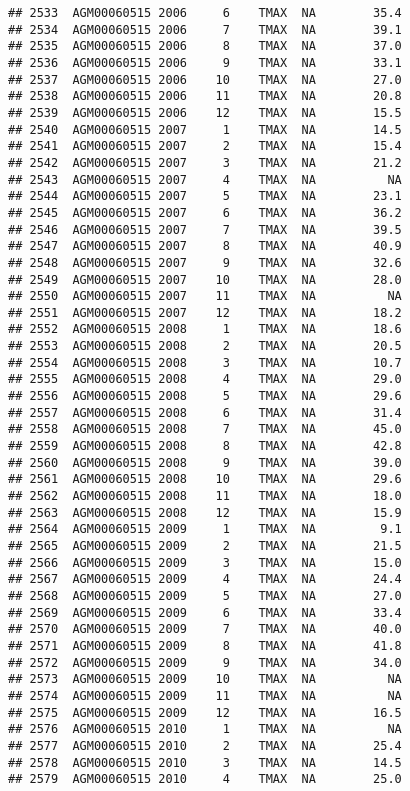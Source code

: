 \documentclass{article}\usepackage[]{graphicx}\usepackage[]{color}
\makeatletter
\newenvironment{kframe}{%
 \def\at@end@of@kframe{}%
 \ifinner\ifhmode%
  \def\at@end@of@kframe{\end{minipage}}%
  \begin{minipage}{\columnwidth}%
 \fi\fi%
 \def\FrameCommand##1{\hskip\@totalleftmargin \hskip-\fboxsep
 \colorbox{shadecolor}{##1}\hskip-\fboxsep
     \hskip-\linewidth \hskip-\@totalleftmargin \hskip\columnwidth}%
 \MakeFramed {\advance\hsize-\width
   \@totalleftmargin\z@ \linewidth\hsize
   \@setminipage}}%
 {\par\unskip\endMakeFramed%
 \at@end@of@kframe}
\newenvironment{knitrout}{}{} %
\makeatother
\begin{document}
\begin{knitrout}
\begin{kframe}
\begin{verbatim}
## 2533  AGM00060515 2006     6    TMAX  NA        35.4
## 2534  AGM00060515 2006     7    TMAX  NA        39.1
## 2535  AGM00060515 2006     8    TMAX  NA        37.0
## 2536  AGM00060515 2006     9    TMAX  NA        33.1
## 2537  AGM00060515 2006    10    TMAX  NA        27.0
## 2538  AGM00060515 2006    11    TMAX  NA        20.8
## 2539  AGM00060515 2006    12    TMAX  NA        15.5
## 2540  AGM00060515 2007     1    TMAX  NA        14.5
## 2541  AGM00060515 2007     2    TMAX  NA        15.4
## 2542  AGM00060515 2007     3    TMAX  NA        21.2
## 2543  AGM00060515 2007     4    TMAX  NA          NA
## 2544  AGM00060515 2007     5    TMAX  NA        23.1
## 2545  AGM00060515 2007     6    TMAX  NA        36.2
## 2546  AGM00060515 2007     7    TMAX  NA        39.5
## 2547  AGM00060515 2007     8    TMAX  NA        40.9
## 2548  AGM00060515 2007     9    TMAX  NA        32.6
## 2549  AGM00060515 2007    10    TMAX  NA        28.0
## 2550  AGM00060515 2007    11    TMAX  NA          NA
## 2551  AGM00060515 2007    12    TMAX  NA        18.2
## 2552  AGM00060515 2008     1    TMAX  NA        18.6
## 2553  AGM00060515 2008     2    TMAX  NA        20.5
## 2554  AGM00060515 2008     3    TMAX  NA        10.7
## 2555  AGM00060515 2008     4    TMAX  NA        29.0
## 2556  AGM00060515 2008     5    TMAX  NA        29.6
## 2557  AGM00060515 2008     6    TMAX  NA        31.4
## 2558  AGM00060515 2008     7    TMAX  NA        45.0
## 2559  AGM00060515 2008     8    TMAX  NA        42.8
## 2560  AGM00060515 2008     9    TMAX  NA        39.0
## 2561  AGM00060515 2008    10    TMAX  NA        29.6
## 2562  AGM00060515 2008    11    TMAX  NA        18.0
## 2563  AGM00060515 2008    12    TMAX  NA        15.9
## 2564  AGM00060515 2009     1    TMAX  NA         9.1
## 2565  AGM00060515 2009     2    TMAX  NA        21.5
## 2566  AGM00060515 2009     3    TMAX  NA        15.0
## 2567  AGM00060515 2009     4    TMAX  NA        24.4
## 2568  AGM00060515 2009     5    TMAX  NA        27.0
## 2569  AGM00060515 2009     6    TMAX  NA        33.4
## 2570  AGM00060515 2009     7    TMAX  NA        40.0
## 2571  AGM00060515 2009     8    TMAX  NA        41.8
## 2572  AGM00060515 2009     9    TMAX  NA        34.0
## 2573  AGM00060515 2009    10    TMAX  NA          NA
## 2574  AGM00060515 2009    11    TMAX  NA          NA
## 2575  AGM00060515 2009    12    TMAX  NA        16.5
## 2576  AGM00060515 2010     1    TMAX  NA          NA
## 2577  AGM00060515 2010     2    TMAX  NA        25.4
## 2578  AGM00060515 2010     3    TMAX  NA        14.5
## 2579  AGM00060515 2010     4    TMAX  NA        25.0

\end{verbatim}
\end{kframe}
\end{knitrout}
\end{document}
